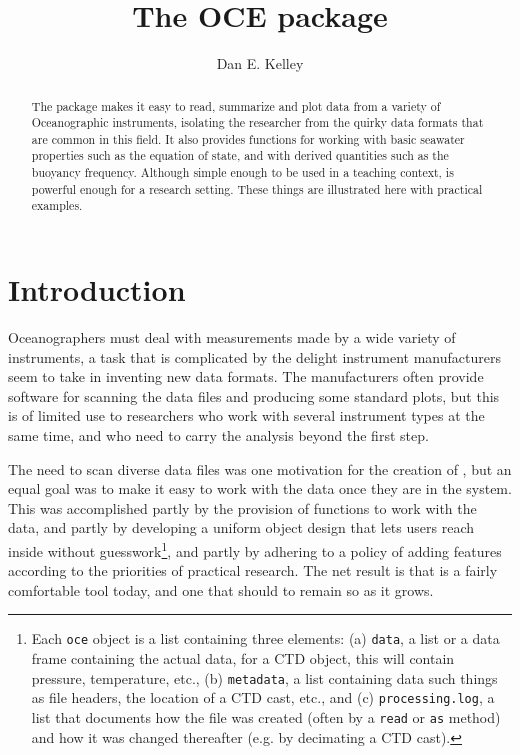 \documentclass{article}
\begin{document}
\title{The OCE package}
\author{Dan E. Kelley}
\maketitle


\begin{abstract}

The \verb@oce@ package makes it easy to read, summarize and plot data from a
variety of Oceanographic instruments, isolating the researcher from the quirky
data formats that are common in this field. It also provides functions for
working with basic seawater properties such as the equation of state, and with
derived quantities such as the buoyancy frequency.  Although simple enough to be
used in a teaching context, \verb@oce@ is powerful enough for a research
setting.  These things are illustrated here with practical examples.

\end{abstract}

\section{Introduction}

Oceanographers must deal with measurements made by a wide variety of
instruments, a task that is complicated by the delight instrument manufacturers
seem to take in inventing new data formats. The manufacturers often provide
software for scanning the data files and producing some standard plots, but this
is of limited use to researchers who work with several instrument types at the
same time, and who need to carry the analysis beyond the first step.

The need to scan diverse data files was one motivation for the creation of
\verb@oce@, but an equal goal was to make it easy to work with the data once
they are in the system.  This was accomplished partly by the provision of
functions to work with the data, and partly by developing a uniform object
design that lets users reach inside without guesswork\footnote{Each \texttt{oce}
object is a list containing three elements: (a) \texttt{data}, a list or a data
frame containing the actual data, for a CTD object, this will contain pressure,
temperature, etc., (b) \texttt{metadata}, a list containing data such things as
file headers, the location of a CTD cast, etc., and (c) \texttt{processing.log},
a list that documents how the file was created (often by a \texttt{read} or
\texttt{as} method) and how it was changed thereafter (e.g. by decimating a CTD
cast).}, and partly by adhering to a policy of adding features according to the
priorities of practical research. The net result is that \verb@oce@ is a fairly
comfortable tool today, and one that should to remain so as it grows.
\end{document}
